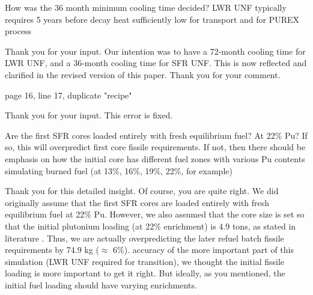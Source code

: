 \documentclass[answers,11pt]{exam}
\begin{document}
\begin{questions}
        \question How was the 36 month minimum cooling time decided? LWR UNF 
        typically requires 5 years before decay heat sufficiently low for 
        transport and for PUREX process

        \begin{solution}
                Thank you for your input. Our intention was to have a 72-month
                cooling time for LWR UNF, and a 36-month cooling time for SFR UNF.
                This is now reflected and clarified in the revised version of
                this paper. Thank you for your comment.
        \end{solution}

        \question page 16, line 17, duplicate "recipe"
        \begin{solution}
                Thank you for your input. This error is fixed.
        \end{solution}

        \question Are the first SFR cores loaded entirely with fresh 
        equilibrium fuel? At 22\% Pu?  If so, this will overpredict first core 
        fissile requirements. If not, then there should be emphasis on how the 
        initial core has different fuel zones with various Pu contents 
        simulating burned fuel (at 13\%, 16\%, 19\%, 22\%, for example)

        \begin{solution}
                Thank you for this detailed insight. Of course, you are quite right. 
                We did originally assume
                that the first SFR cores are loaded entirely with
                fresh equilibrium fuel at 22\% Pu. However, we also assumed
                that the core size is set so that the initial plutonium
                loading (at 22\% enrichment) is 4.9 tons, as stated in
                literature \cite{chenaud_status_2013}. Thus, we are
                actually overpredicting the later refuel batch fissile
                requirements by 74.9 kg ($\approx$ 6\%). 
                accuracy of the more important part of this simulation
                (LWR UNF required for transition), we thought the 
                initial fissile loading is more important to get it right.
                But ideally, as you mentioned, the initial fuel loading
                should have varying enrichments.       
        \end{solution}



\end{questions}
\end{document}
